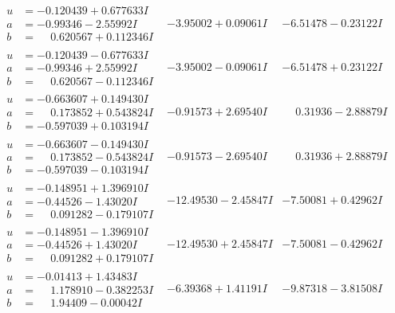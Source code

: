 \documentclass[1p]{elsarticle_modified}
\theoremstyle{definition}
\begin{document}
$$\begin{array}{c|c|c}
\begin{aligned}
u &= -0.120439 + 0.677633 I \\
a &= -0.99346 - 2.55992 I \\
b &= \phantom{-}0.620567 + 0.112346 I\end{aligned}
 & -3.95002 + 0.09061 I & -6.51478 - 0.23122 I \\ \hline\begin{aligned}
u &= -0.120439 - 0.677633 I \\
a &= -0.99346 + 2.55992 I \\
b &= \phantom{-}0.620567 - 0.112346 I\end{aligned}
 & -3.95002 - 0.09061 I & -6.51478 + 0.23122 I \\ \hline\begin{aligned}
u &= -0.663607 + 0.149430 I \\
a &= \phantom{-}0.173852 + 0.543824 I \\
b &= -0.597039 + 0.103194 I\end{aligned}
 & -0.91573 + 2.69540 I & \phantom{-}0.31936 - 2.88879 I \\ \hline\begin{aligned}
u &= -0.663607 - 0.149430 I \\
a &= \phantom{-}0.173852 - 0.543824 I \\
b &= -0.597039 - 0.103194 I\end{aligned}
 & -0.91573 - 2.69540 I & \phantom{-}0.31936 + 2.88879 I \\ \hline\begin{aligned}
u &= -0.148951 + 1.396910 I \\
a &= -0.44526 - 1.43020 I \\
b &= \phantom{-}0.091282 - 0.179107 I\end{aligned}
 & -12.49530 - 2.45847 I & -7.50081 + 0.42962 I \\ \hline\begin{aligned}
u &= -0.148951 - 1.396910 I \\
a &= -0.44526 + 1.43020 I \\
b &= \phantom{-}0.091282 + 0.179107 I\end{aligned}
 & -12.49530 + 2.45847 I & -7.50081 - 0.42962 I \\ \hline\begin{aligned}
u &= -0.01413 + 1.43483 I \\
a &= \phantom{-}1.178910 - 0.382253 I \\
b &= \phantom{-}1.94409 - 0.00042 I\end{aligned}
 & -6.39368 + 1.41191 I & -9.87318 - 3.81508 I \\ \hline\begin{aligned}

\end{aligned}
\end{array}$$
\end{document}
